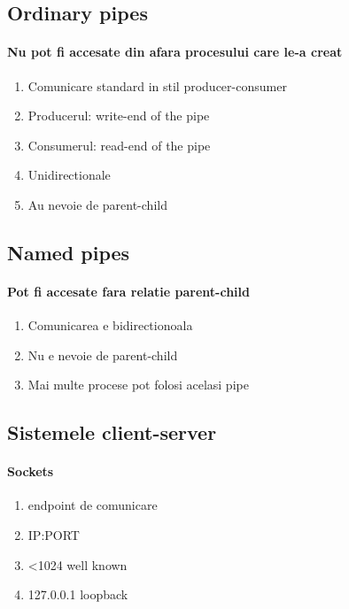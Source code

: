 \documentclass{article}
\begin{document}
\subsection*{Ordinary pipes}
\paragraph*{Nu pot fi accesate din afara procesului care le-a creat}
\begin{enumerate}
    \item Comunicare standard in stil producer-consumer
    \item Producerul: write-end of the pipe
    \item Consumerul: read-end of the pipe
    \item Unidirectionale
    \item Au nevoie de parent-child
\end{enumerate}

\subsection*{Named pipes}
\paragraph*{Pot fi accesate fara relatie parent-child}
\begin{enumerate}
    \item Comunicarea e bidirectionoala
    \item Nu e nevoie de parent-child
    \item Mai multe procese pot folosi acelasi pipe
\end{enumerate}

\subsection*{Sistemele client-server}
\paragraph*{Sockets}
\begin{enumerate}
    \item endpoint de comunicare
    \item IP:PORT
    \item <1024 well known
    \item 127.0.0.1 loopback
\end{enumerate}
\end{document}
